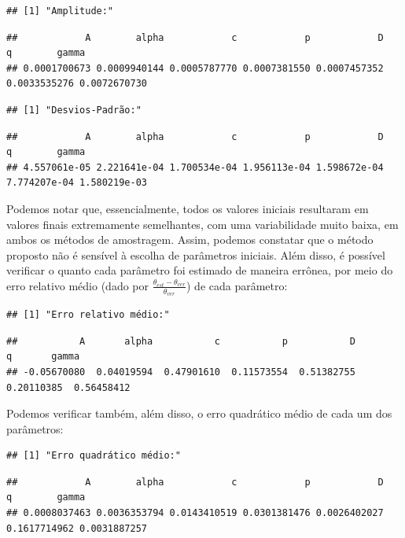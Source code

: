 \documentclass[11pt,]{article}
\begin{document}
\begin{verbatim}
## [1] "Amplitude:"
\end{verbatim}

\begin{verbatim}
##            A        alpha            c            p            D            q        gamma 
## 0.0001700673 0.0009940144 0.0005787770 0.0007381550 0.0007457352 0.0033535276 0.0072670730
\end{verbatim}

\begin{verbatim}
## [1] "Desvios-Padrão:"
\end{verbatim}

\begin{verbatim}
##            A        alpha            c            p            D            q        gamma 
## 4.557061e-05 2.221641e-04 1.700534e-04 1.956113e-04 1.598672e-04 7.774207e-04 1.580219e-03
\end{verbatim}

Podemos notar que, essencialmente, todos os valores iniciais resultaram
em valores finais extremamente semelhantes, com uma variabilidade muito
baixa, em ambos os métodos de amostragem. Assim, podemos constatar que o
método proposto não é sensível à escolha de parâmetros iniciais. Além
disso, é possível verificar o quanto cada parâmetro foi estimado de
maneira errônea, por meio do erro relativo médio (dado por
\(\frac{\theta_{est} - \theta_{ver}}{\theta_{ver}}\)) de cada parâmetro:

\begin{verbatim}
## [1] "Erro relativo médio:"
\end{verbatim}

\begin{verbatim}
##           A       alpha           c           p           D           q       gamma 
## -0.05670080  0.04019594  0.47901610  0.11573554  0.51382755  0.20110385  0.56458412
\end{verbatim}

Podemos verificar também, além disso, o erro quadrático médio de cada um
dos parâmetros:

\begin{verbatim}
## [1] "Erro quadrático médio:"
\end{verbatim}

\begin{verbatim}
##            A        alpha            c            p            D            q        gamma 
## 0.0008037463 0.0036353794 0.0143410519 0.0301381476 0.0026402027 0.1617714962 0.0031887257
\end{verbatim}
\end{document}
